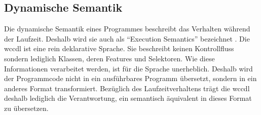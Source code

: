 \subsection{Dynamische Semantik}
    Die dynamische Semantik eines Programmes beschreibt das Verhalten
    während der Laufzeit. Deshalb wird sie auch als "`Execution Semantics"' bezeichnet
    \cite[Kapitel 4.3]{voelter:DslEngineering}.
    Die \gls{wccdl} ist eine rein deklarative Sprache.
    Sie beschreibt keinen Kontrollfluss sondern lediglich
    Klassen, deren Features und Selektoren.
    Wie diese Informationen verarbeitet werden, ist für die Sprache unerheblich.
    Deshalb wird der Programmcode nicht in ein ausführbares Programm übersetzt,
    sondern in ein anderes Format transformiert.
    Bezüglich des Laufzeitverhaltens trägt die \gls{wccdl}
    deshalb lediglich die Verantwortung, ein {\classificationModel}
    semantisch äquivalent in dieses Format zu übersetzen.